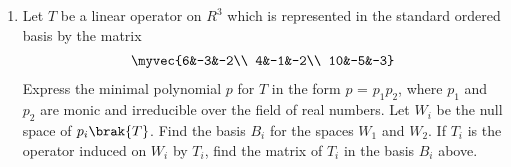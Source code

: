 \renewcommand{\theequation}{\theenumi}
\renewcommand{\thefigure}{\theenumi}
\begin{enumerate}[label=\thesubsection.\arabic*.,ref=\thesubsection.\theenumi]

\item %
Let $T$ be a linear operator on $R^3$ which is represented in the standard ordered basis by the matrix 
\begin{align}
    \myvec{6&-3&-2\\
           4&-1&-2\\
           10&-5&-3}
\end{align}
Express the minimal polynomial $p$ for $T$ in the form $p$ = $p_1p_2$, where $p_1$ and $p_2$ are monic and irreducible over the field of real numbers. Let $W_i$ be the null space of $p_i\brak{T}$. Find the basis $B_i$ for the spaces $W_1$ and $W_2$. If $T_i$ is the operator induced on $W_i$ by $T_i$, find the matrix of $T_i$ in the basis $B_i$ above.
%
%
\solution

\end{enumerate}
